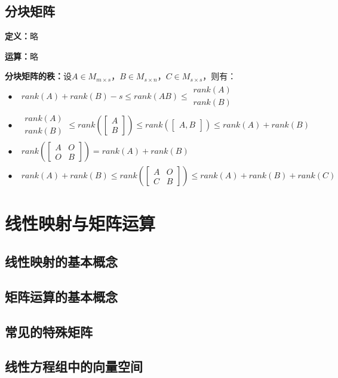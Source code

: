 \documentclass[zihao=-4,UTF8]{report}
\begin{document}
\subsection{分块矩阵}
\textbf{定义：}略\par
\textbf{运算：}略\par
\textbf{分块矩阵的秩：}设$A\in M_{m\times s}$，$B\in M_{s\times n}$，$C\in M_{s\times s}$，则有：
\begin{align*}
    \bullet \;&rank(A)+rank(B)-s \le rank(AB) \le 
    \begin{matrix}rank(A)\\rank(B)\end{matrix}\\
    \bullet \;&\begin{matrix}rank(A)\\rank(B)\end{matrix} \le rank(\begin{bmatrix}A\\B\end{bmatrix}) \le rank(\begin{bmatrix}A,B\end{bmatrix})
    \le rank(A)+rank(B)\\
    \bullet \;&rank(\begin{bmatrix}A&O\\O&B\end{bmatrix})=rank(A)+rank(B)\\
    \bullet \;&rank(A)+rank(B) \le rank (\begin{bmatrix}A&O\\C&B\end{bmatrix}) \le rank(A)+rank(B)+rank(C)
\end{align*}

\section{线性映射与矩阵运算}
\subsection{线性映射的基本概念}
\subsection{矩阵运算的基本概念}
\subsection{常见的特殊矩阵}
\subsection{线性方程组中的向量空间}
\end{document}
